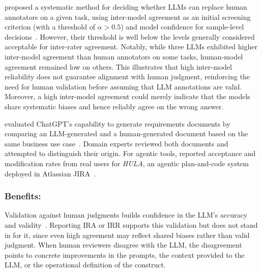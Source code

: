 \documentclass[smallextended]{svjour3}
\newcommand{\guidelinesubsubsection}[1]{\subsubsection{\bfseries #1:}}
\newcommand{\guidelinesubsubsection}[1]{\subsubsection{#1}}
\begin{document}
\citeauthor{DBLP:conf/msr/AhmedDTP25} proposed a systematic method for deciding whether LLMs can replace human annotators on a given task, using inter-model agreement as an initial screening criterion (with a threshold of $\alpha>0.5$) and model confidence for sample-level decisions~\cite{DBLP:conf/msr/AhmedDTP25}. However, their threshold is well below the levels generally considered acceptable for inter-rater agreement.
Notably, while three LLMs exhibited higher inter-model agreement than human annotators on some tasks, human-model agreement remained low on others.
This illustrates that high inter-model reliability does not guarantee alignment with human judgment, reinforcing the need for human validation before assuming that LLM annotations are valid.
Moreover, a high inter-model agreement could merely indicate that the models share systematic biases and hence reliably agree on the wrong answer.

\citeauthor{DBLP:journals/corr/abs-2501-19297} evaluated ChatGPT's capability to generate requirements documents by comparing an LLM-generated and a human-generated document based on the same business use case~\cite{DBLP:journals/corr/abs-2501-19297}. Domain experts reviewed both documents and attempted to distinguish their origin.
For agentic tools, \citeauthor{DBLP:conf/icse-seip/TakerngsaksiriPTTZJLCCW25} reported acceptance and modification rates from real users for \emph{HULA}, an agentic plan-and-code system deployed in Atlassian JIRA~\cite{DBLP:conf/icse-seip/TakerngsaksiriPTTZJLCCW25}.

\guidelinesubsubsection{Benefits}

Validation against human judgments builds confidence in the LLM's accuracy and validity~\cite{khraisha2024canlargelanguagemodelshumans}. Reporting IRA or IRR supports this validation but does not stand in for it, since even high agreement may reflect shared biases rather than valid judgment. When human reviewers disagree with the LLM, the disagreement points to concrete improvements in the prompts, the context provided to the LLM, or the operational definition of the construct.
\end{document}
